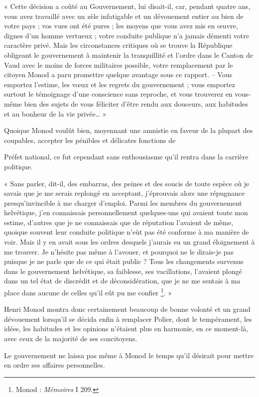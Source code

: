 \documentclass[french,twoside]{book} %
\newenvironment{quoteblock}%
  {\begin{quoting}}
  {\end{quoting}}
\newenvironment{quotebar}{%
    \def\FrameCommand{{\color{rubric!10!}\vrule width 0.5em} \hspace{0.9em}}%
    \def\OuterFrameSep{\itemsep} %
    \MakeFramed {\advance\hsize-\width \FrameRestore}
  }%
  {%
    \endMakeFramed
  }
\renewenvironment{quoteblock}%
  {%
    \savenotes
    \setstretch{0.9}
    \begin{quotebar}
  }
  {%
    \end{quotebar}
    \spewnotes
  }
\begin{document}
\begin{quoteblock}
 \noindent « Cette décision a coûté au Gouvernement, lui disait-il, car, pendant quatre ans, vous avez travaillé avec un zèle infatigable et un dévouement entier au bien de votre pays ; vos vues ont été pures ; les moyens que vous avez mis en œuvre, dignes d’un homme vertueux ; votre conduite publique n’a jamais démenti votre caractère privé. Mais les circonstances critiques où se trouve la République obligeant le gouvernement à maintenir la tranquillité et l’ordre dans le Canton de Vaud avec le moins de forces militaires possible, votre remplacement par le citoyen Monod a paru promettre quelque avantage sous ce rapport. – Vous emportez l’estime, les vœux et les regrets du gouvernement ; vous emportez surtout le témoignage d’une conscience sans reproche, et vous trouverez en vous-même bien des sujets de vous féliciter d’être rendu aux douceurs, aux habitudes et au bonheur de la vie privée… »
 \end{quoteblock}

\noindent Quoique Monod voulût bien, moyennant une amnistie en faveur de la plupart des coupables, accepter les pénibles et délicates fonctions de\par
Préfet national, ce fut cependant sans enthousiasme qu’il rentra dans la carrière politique.\par

\begin{quoteblock}
 \noindent « Sans parler, dit-il, des embarras, des peines et des soucis de toute espèce où je savais que je me serais replongé en acceptant, j’éprouvais alors une répugnance presqu’invincible à me charger d’emploi. Parmi les membres du gouvernement helvétique, j’en connaissais personnellement quelques-uns qui avaient toute mon estime, d’autres que je ne connaissais que de réputation l’avaient de même, quoique souvent leur conduite politique n’eùt pas été conforme à ma manière de voir. Mais il y en avait sous les ordres desquels j’aurais eu un grand éloignement à me trouver. Je n’hésite pas même à l’avouer, et pourquoi ne le dirais-je pas puisque je ne parle que de ce qui était public ? Tous les changements survenus dans le gouvernement helvétique, sa faiblesse, ses vacillations, l’avaient plongé dans un tel état de discrédit et de déconsidération, que je ne me sentais à ma place dans aucune de celles qu’il eût pu me confier \footnote{Monod : \emph{Mémoires} I 209.}. »
 \end{quoteblock}

\noindent Henri Monod montra donc certainement beaucoup de bonne volonté et un grand dévouement lorsqu’il se décida enfin à remplacer Polier, dont le tempérament, les idées, les habitudes et les opinions n’étaient plus en harmonie, en ce moment-là, avec ceux de la majorité de ses concitoyens.\par
Le gouvernement ne laissa pas même à Monod le temps qu’il désirait pour mettre en ordre ses affaires personnelles.\par
\end{document}
